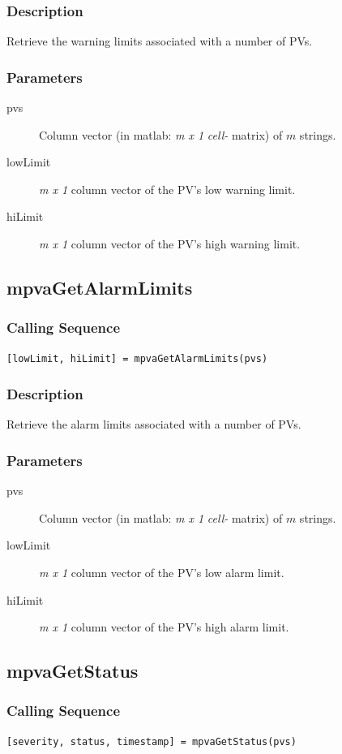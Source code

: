 \documentclass{article}
\newcommand{\pbrk}{\pagebreak[3]}
\newcommand{\ita}[1]{\emph{#1}}
\newcommand{\m}{$m$}
\newcommand{\mhack}{$m$} %
\newcommand{\mxl}{$m\times 1$}
\renewcommand{\m}{\ita{m}}
\newcommand{\mhack}{\ita{m}} %
\renewcommand{\mxl}{\ita{m x 1}}
\renewcommand{\pbrk}{}
\newcommand{\PVITEM}{
\item[pvs] Column vector (in matlab: \mxl{} \ita{cell-} matrix)
of \mhack{} strings.
}
\begin{document}
\subsubsection{Description}
Retrieve the warning limits associated with a number of PVs.
\subsubsection{Parameters}
\begin{description}
\PVITEM
\item[lowLimit] \mxl{} column vector of the PV's low warning limit.
\item[hiLimit]  \mxl{} column vector of the PV's high warning limit.
\end{description}

\vspace*{\fill}
\pbrk
\subsection{mpvaGetAlarmLimits}
\subsubsection{Calling Sequence}
\begin{verbatim}
[lowLimit, hiLimit] = mpvaGetAlarmLimits(pvs)
\end{verbatim}
\subsubsection{Description}
Retrieve the alarm limits associated with a number of PVs.
\subsubsection{Parameters}
\begin{description}
\PVITEM
\item[lowLimit] \mxl{} column vector of the PV's low alarm limit.
\item[hiLimit]  \mxl{} column vector of the PV's high alarm limit.
\end{description}

\vspace*{\fill}
\pbrk
\subsection{mpvaGetStatus}
\subsubsection{Calling Sequence}
\begin{verbatim}
[severity, status, timestamp] = mpvaGetStatus(pvs)
\end{verbatim}
\end{document}
